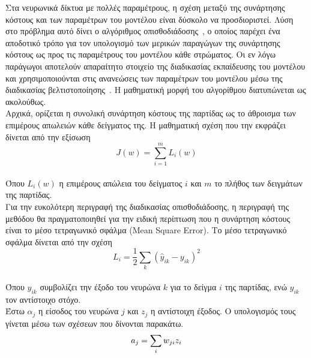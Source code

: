 \documentclass[12pt]{article}
\numberwithin{equation}{section}
\begin{document}
Στα νευρωνικά δίκτυα με πολλές παραμέτρους, η σχέση μεταξύ της συνάρτησης κόστους και των παραμέτρων του μοντέλου είναι δύσκολο να προσδιοριστεί. Λύση στο πρόβλημα αυτό δίνει ο αλγόριθμος οπισθοδιάδοσης~\cite{bishop2006pattern}, ο οποίος παρέχει ένα αποδοτικό τρόπο για τον υπολογισμό των μερικών παραγώγων της συνάρτησης κόστους ως προς τις παραμέτρους του μοντέλου κάθε στρώματος. Οι εν λόγω παράγωγοι αποτελούν απαραίτητο στοιχείο της διαδικασίας εκπαίδευσης του μοντέλου και χρησιμοποιούνται στις ανανεώσεις των παραμέτρων του μοντέλου μέσω της διαδικασίας βελτιστοποίησης~\cite{higham2018deeplearningintroductionapplied}. Η μαθηματική μορφή του αλγορίθμου διατυπώνεται ως ακολούθως. \\

\noindent Αρχικά, ορίζεται η συνολική συνάρτηση κόστους της παρτίδας ως το άθροισμα των επιμέρους απωλειών κάθε δείγματος της. Η μαθηματική σχέση που την εκφράζει δίνεται από την εξίσωση\\

\begin{equation}
J(w) = \sum_{i=1}^{m} L_i(w)
\end{equation}\\

\noindent Όπου \(L_i(w)\) η επιμέρους απώλεια του δείγματος \(i\) και \(m\) το πλήθος των δειγμάτων της παρτίδας.\\

\noindent Για την ευκολότερη περιγραφή της διαδικασίας οπισθοδιάδοσης, η περιγραφή της μεθόδου θα πραγματοποιηθεί για την ειδική περίπτωση που η συνάρτηση κόστους είναι το μέσο τετραγωνικό σφάλμα (Mean Square Error). Το μέσο τετραγωνικό σφάλμα δίνεται από την σχέση\\

\begin{equation}
L_i = \frac{1}{2} \sum_k (\hat{y}_{ik} - y_{ik})^2
\label{eq:μέσο τετραγωνικό σφάλμα}
\end{equation}\\

\noindent Όπου \(\hat{y}_{ik}\) συμβολίζει την έξοδο του νευρώνα \(k\) για το δείγμα \(i\) της παρτίδας, ενώ \(y_{ik}\) τον αντίστοιχο στόχο.\\

\noindent Έστω \(\alpha_j\) η είσοδος του νευρώνα \(j\) και \(z_j\) η αντίστοιχη έξοδος. Ο υπολογισμός τους γίνεται μέσω των σχέσεων που δίνονται παρακάτω.\\

\begin{equation}
a_j = \sum_i w_{ji} z_i \\
\label{eq:(3.28)}
\end{equation}\\
\end{document}
